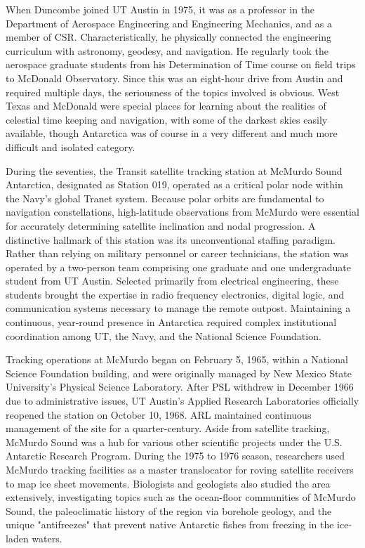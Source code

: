 When Duncombe joined UT Austin in 1975, it was as a professor in the Department of Aerospace Engineering and Engineering Mechanics, and as a member of CSR. Characteristically, he physically connected the engineering curriculum with astronomy, geodesy, and navigation. He regularly took the aerospace graduate students from his Determination of Time course on field trips to McDonald Observatory. Since this was an eight-hour drive from Austin and required multiple days, the seriousness of the topics involved is obvious. West Texas and McDonald were special places for learning about the realities of celestial time keeping and navigation, with some of the darkest skies easily available, though Antarctica was of course in a very different and much more difficult and isolated category.

During the seventies, the Transit satellite tracking station at McMurdo Sound Antarctica, designated as Station 019, operated as a critical polar node within the Navy's global Tranet system. Because polar orbits are fundamental to navigation constellations, high-latitude observations from McMurdo were essential for accurately determining satellite inclination and nodal progression. A distinctive hallmark of this station was its unconventional staffing paradigm. Rather than relying on military personnel or career technicians, the station was operated by a two-person team comprising one graduate and one undergraduate student from UT Austin. Selected primarily from electrical engineering, these students brought the expertise in radio frequency electronics, digital logic, and communication systems necessary to manage the remote outpost. Maintaining a continuous, year-round presence in Antarctica required complex institutional coordination among UT, the Navy, and the National Science Foundation.

Tracking operations at McMurdo began on February 5, 1965, within a National Science Foundation building, and were originally managed by New Mexico State University's Physical Science Laboratory. After PSL withdrew in December 1966 due to administrative issues, UT Austin's Applied Research Laboratories officially reopened the station on October 10, 1968. ARL maintained continuous management of the site for a quarter-century. Aside from satellite tracking, McMurdo Sound was a hub for various other scientific projects under the U.S. Antarctic Research Program. During the 1975 to 1976 season, researchers used McMurdo tracking facilities as a master translocator for roving satellite receivers to map ice sheet movements. Biologists and geologists also studied the area extensively, investigating topics such as the ocean-floor communities of McMurdo Sound, the paleoclimatic history of the region via borehole geology, and the unique "antifreezes" that prevent native Antarctic fishes from freezing in the ice-laden waters.

